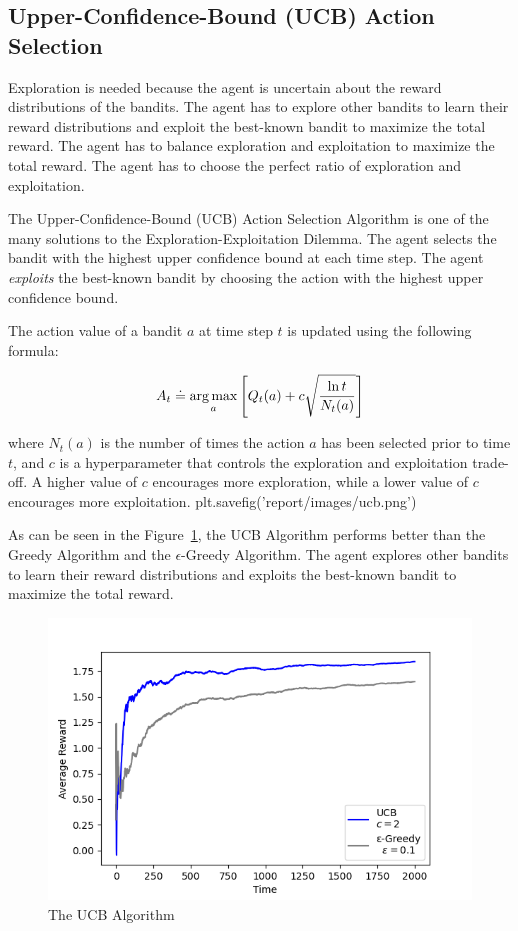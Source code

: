 \subsection{Upper-Confidence-Bound (UCB) Action Selection}

Exploration is needed because the agent is uncertain about the reward distributions of the bandits. The agent has to explore other bandits to learn their reward distributions and exploit the best-known bandit to maximize the total reward. The agent has to balance exploration and exploitation to maximize the total reward. The agent has to choose the perfect ratio of exploration and exploitation.

The Upper-Confidence-Bound (UCB) Action Selection Algorithm is one of the many solutions to the Exploration-Exploitation Dilemma. The agent selects the bandit with the highest upper confidence bound at each time step. The agent \textit{exploits} the best-known bandit by choosing the action with the highest upper confidence bound.

The action value of a bandit $a$ at time step $t$ is updated using the following formula:

\begin{equation}
    A_t \doteq \operatorname*{arg\,max}_{a} \left[Q_t(a) + c\sqrt{\frac{\ln t}{N_t(a)}}\right]
\end{equation}

where $N_t(a)$ is the number of times the action $a$ has been selected prior to time $t$, and $c$ is a hyperparameter that controls the exploration and exploitation trade-off. A higher value of $c$ encourages more exploration, while a lower value of $c$ encourages more exploitation.
plt.savefig('report/images/ucb.png')

As can be seen in the Figure~\ref{fig:ucb}, the UCB Algorithm performs better than the Greedy Algorithm and the $\epsilon$-Greedy Algorithm. The agent explores other bandits to learn their reward distributions and exploits the best-known bandit to maximize the total reward.

\begin{figure}[h!]
    \centering
    \includegraphics[width=0.75\linewidth]{images/ucb.png}
    \caption{The UCB Algorithm}
    \label{fig:ucb}
\end{figure}




